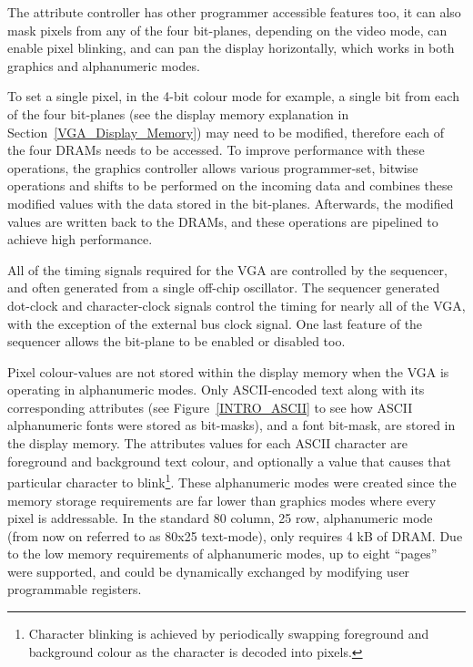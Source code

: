 The attribute controller has other programmer accessible features too, it can
also mask pixels from any of the four bit-planes, depending on the video mode, can
enable pixel blinking, and can pan the display horizontally, which works in both
graphics and alphanumeric modes.

To set a single pixel, in the 4-bit colour mode for example, a single bit from
each of the four bit-planes (see the display memory explanation in
Section~\ref{VGA_Display_Memory}) may need to be modified, therefore each of the
four DRAMs needs to be accessed. To improve performance with these operations,
the graphics controller allows various programmer-set, bitwise operations and
shifts to be performed on the incoming data and combines these modified values
with the data stored in the bit-planes. Afterwards, the modified values are
written back to the DRAMs, and these operations are pipelined to achieve high
performance.

All of the timing signals required for the VGA are controlled by the sequencer,
and often generated from a single off-chip oscillator. The sequencer generated
dot-clock and character-clock signals control the timing for nearly all of the
VGA, with the exception of the external bus clock signal. One last feature of the
sequencer allows the bit-plane to be enabled or disabled too.

Pixel colour-values are not stored within the display memory when the VGA is
operating in alphanumeric modes. Only ASCII-encoded text along with its
corresponding attributes (see Figure~\ref{INTRO_ASCII} to see how ASCII
alphanumeric fonts were stored as bit-masks), and a font bit-mask, are stored in
the display memory. The attributes values for each ASCII character are foreground
and background text colour, and optionally a value that causes that particular
character to blink\footnote{Character blinking is achieved by periodically
swapping foreground and background colour as the character is decoded into
pixels.}. These alphanumeric modes were created since the memory storage
requirements are far lower than graphics modes where every pixel is addressable.
In the standard 80 column, 25 row, alphanumeric mode (from now on referred to as
80x25 text-mode), only requires 4 kB of DRAM. Due to the low memory requirements
of alphanumeric modes, up to eight ``pages'' were supported, and could be
dynamically exchanged by modifying user programmable registers.


